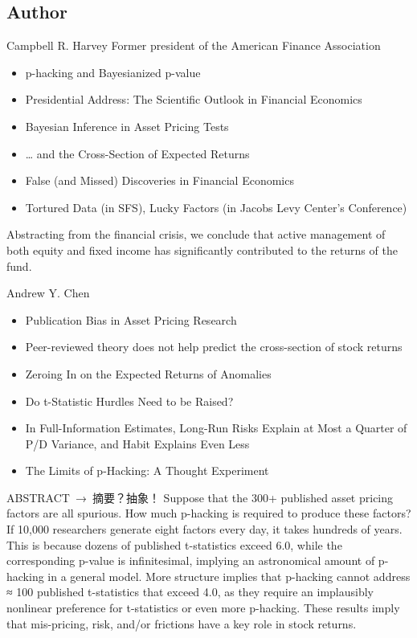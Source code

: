 \documentclass[UTF8, 16pt]{beamer}
\begin{document}
\begin{CJK*}{UTF8}{gbsn}
\section{Author}
\begin{frame}{Campbell R. Harvey}
	Former president of the American Finance Association
	\begin{itemize}
		\item p-hacking and Bayesianized p-value
		\item Presidential Address: The Scientific Outlook in Financial Economics
		\item Bayesian Inference in Asset Pricing Tests
		\item … and the Cross-Section of Expected Returns
		\item False (and Missed) Discoveries in Financial Economics
		\item Tortured Data (in SFS), Lucky Factors (in Jacobs Levy Center’s Conference)
	\end{itemize}
	Abstracting from the \alert{financial crisis}, we conclude that active management of both equity and fixed income has significantly contributed to the returns of the fund.
\end{frame}
\begin{frame}{Andrew Y. Chen}
	\begin{itemize}
		\item \alert{Publication Bias} in Asset Pricing Research
		\item Peer-reviewed theory does \alert{not} help predict the cross-section of stock returns
		\item \alert{Zeroing} In on the Expected Returns of Anomalies
		\item Do t-Statistic Hurdles Need to be Raised?
		\item In Full-Information Estimates, Long-Run Risks Explain at Most a Quarter of P/D Variance, and Habit Explains Even Less
		\item The Limits of \alert{p-Hacking}: A Thought Experiment
	\end{itemize}
\end{frame}
\begin{frame}{ABSTRACT\ →\ 摘要？抽象！}
	Suppose that the 300+ published asset pricing factors are all spurious. How much p-hacking is required to produce these factors? If 10,000 researchers generate eight factors every day, it takes hundreds of years. This is because dozens of published t-statistics exceed 6.0, while the corresponding p-value is infinitesimal, implying an astronomical amount of p-hacking in a general model. More structure implies that p-hacking cannot address  ≈ 100 published t-statistics that exceed 4.0, as they require an implausibly nonlinear preference for t-statistics or even more p-hacking. These results imply that mis-pricing, risk, and/or frictions have a key role in stock returns.
\end{frame}


\end{CJK*}
\end{document}
